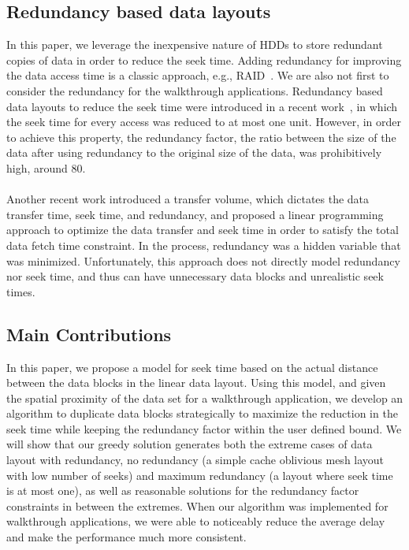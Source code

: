 \documentclass[conference]{acmsiggraph}
\begin{document}
\subsection{Redundancy based data layouts}

In this paper, we leverage the inexpensive nature of HDDs to store redundant copies of data in order to reduce the seek time. Adding redundancy for improving the data access time is a classic approach, e.g., RAID~\cite{Patterson88}.  We are also not first to consider the redundancy for the walkthrough applications.  Redundancy based data layouts to reduce the seek time were introduced in a recent work~\cite{singleseeklayout}, in which the seek time for every access was reduced to at most one unit. However, in order to achieve this property, the redundancy factor, the ratio between the size of the data after using redundancy to the original size of the data, was prohibitively high, around 80. \\
\\
Another recent work \cite{optimizingredundancy} introduced a transfer volume, which dictates the data transfer time, seek time, and redundancy, and proposed a linear programming approach to optimize the data transfer and seek time in order to satisfy the total data fetch time constraint. In the process, redundancy was a hidden variable that was minimized. Unfortunately, this approach does not directly model redundancy nor seek time, and thus can have unnecessary data blocks and unrealistic seek times. 

\subsection{Main Contributions}

In this paper, we propose a model for seek time based on the actual distance between the data blocks in the linear data layout. Using this model, and given the spatial proximity of the data set for a walkthrough application, we develop an algorithm to duplicate data blocks strategically to maximize the reduction in the seek time while keeping the redundancy factor within the user defined bound. We will show that our greedy solution generates both the extreme cases of data layout with redundancy, no redundancy (a simple cache oblivious mesh layout with low number of seeks) and maximum redundancy (a layout where seek time is at most one), as well as reasonable solutions for the redundancy factor constraints in between the extremes. When our algorithm was implemented for walkthrough applications, we were able to noticeably reduce the average delay and make the performance much more consistent. 
\end{document}
